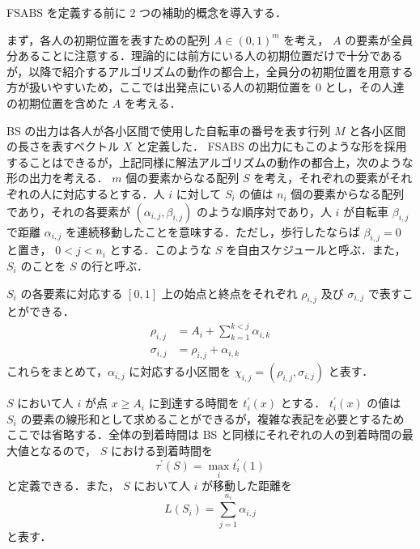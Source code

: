 FSABS を定義する前に 2 つの補助的概念を導入する．

まず，各人の初期位置を表すための配列 $A \in {(0, 1)}^{m}$ を考え， $A$ の要素が全員分あることに注意する．理論的には前方にいる人の初期位置だけで十分であるが，以降で紹介するアルゴリズムの動作の都合上，全員分の初期位置を用意する方が扱いやすいため，ここでは出発点にいる人の初期位置を 0 とし，その人達の初期位置を含めた $A$ を考える．

BS の出力は各人が各小区間で使用した自転車の番号を表す行列 $M$ と各小区間の長さを表すベクトル $X$ と定義した． FSABS の出力にもこのような形を採用することはできるが，上記同様に解法アルゴリズムの動作の都合上，次のような形の出力を考える． $m$ 個の要素からなる配列 $S$ を考え，それぞれの要素がそれぞれの人に対応するとする．人 $i$ に対して $S_i$ の値は $n_i$ 個の要素からなる配列であり，それの各要素が $(\alpha_{i,j}, \beta_{i,j})$ のような順序対であり，人 $i$ が自転車 $\beta_{i,j}$ で距離 $\alpha_{i,j}$ を連続移動したことを意味する．ただし，歩行したならば $\beta_{i,j} = 0$ と置き， $0 < j < n_i$ とする．このような $S$ を自由スケジュールと呼ぶ．また， $S_i$ のことを $S$ の行と呼ぶ．

$S_i$ の各要素に対応する $[0, 1]$ 上の始点と終点をそれぞれ $\rho_{i,j}$ 及び $\sigma_{i,j}$ で表すことができる．
\begin{align}
  \rho_{i,j} &= A_i + \sum_{k=1}^{k < j}\alpha_{i, k} \\
  \sigma_{i,j} &= \rho_{i,j} + \alpha_{i, k}
\end{align}
これらをまとめて，$\alpha_{i,j}$ に対応する小区間を $\chi_{i,j} = (\rho_{i,j}, \sigma_{i,j})$ と表す．

$S$ において人 $i$ が点 $x \geq A_i$ に到達する時間を $t^{\prime}_i(x)$ とする． $t^{\prime}_i(x)$ の値は $S_i$ の要素の線形和として求めることができるが，複雑な表記を必要とするためここでは省略する．全体の到着時間は BS と同様にそれぞれの人の到着時間の最大値となるので， $S$ における到着時間を
\begin{equation}
  \tau^\prime(S) = \max_i t^{\prime}_i(1)
\end{equation}
と定義できる．また， $S$ において人 $i$ が移動した距離を
\begin{equation}
  L(S_i) = \sum_{j=1}^{n_i} \alpha_{i,j}
\end{equation}
と表す．

